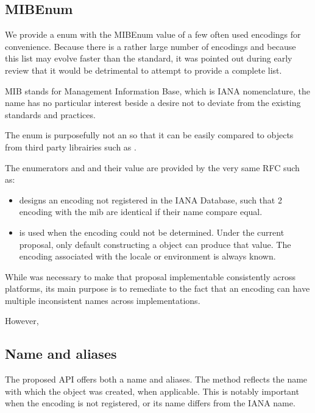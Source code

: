 \documentclass{wg21}
\begin{document}
\subsection{MIBEnum}

We provide a  enum with the MIBEnum value of a few often used encodings for convenience.
Because there is a rather large number of encodings and because this list may evolve faster than the standard, it was pointed out during early review that it would be detrimental to attempt to provide a complete list.
\begin{note}
MIB stands for Management Information Base, which is IANA nomenclature, the name has no particular interest beside a desire not to deviate from the existing standards and practices. 
\end{note}

The enum is purposefully not an  so that it can be easily compared to objects from
third party librairies such as .

The enumerators  and  and their value are provided by the very same RFC such as:

\begin{itemize}
	\item {} designs an encoding not registered in the IANA Database, such that 2 encoding with the  mib are identical if their name compare equal.
	\item {} is used when the encoding could not be determined. Under the current proposal,  only default constructing a  object can produce that value. The encoding associated with the
	locale or environment is always known.
\end{itemize}

While  was necessary to make that proposal implementable consistently across platforms,
its main purpose is to remediate to the fact that an encoding can have multiple inconsistent names across implementations.

However, 

\subsection{Name and aliases}

The proposed API offers both a name and aliases.
The  method reflects the name with which the  object was created, when applicable.
This is notably important when the encoding is not registered, or its name differs from the IANA name.
\end{document}
